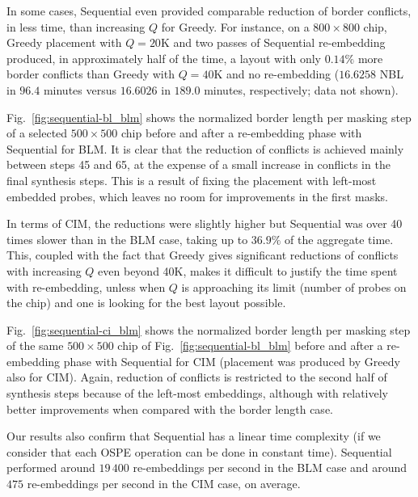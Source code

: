 In some cases, Sequential even provided comparable reduction of border
conflicts, in less time, than increasing $Q$ for Greedy. For instance, on a
$800\times 800$ chip, Greedy placement with $Q=20$K and two passes of Sequential
re-embedding produced, in approximately half of the time, a layout with only
$0.14\%$ more border conflicts than Greedy with $Q=40$K and no re-embedding
($16.6258$ NBL in $96.4$ minutes versus $16.6026$ in $189.0$ minutes,
respectively; data not shown).

Fig.~\ref{fig:sequential-bl_blm} shows the normalized border length per masking
step of a selected $500\times 500$ chip before and after a re-embedding phase
with Sequential for BLM. It is clear that the reduction of conflicts is achieved
mainly between steps 45 and 65, at the expense of a small increase in conflicts
in the final synthesis steps. This is a result of fixing the placement with
left-most embedded probes, which leaves no room for improvements in the first
masks.

In terms of CIM, the reductions were slightly higher but Sequential was over 40
times slower than in the BLM case, taking up to $36.9\%$ of the aggregate time.
This, coupled with the fact that Greedy gives significant reductions of
conflicts with increasing $Q$ even beyond 40K, makes it difficult to justify the
time spent with re-embedding, unless when $Q$ is approaching its limit (number
of probes on the chip) and one is looking for the best layout possible.

Fig.~\ref{fig:sequential-ci_blm} shows the normalized border length per masking
step of the same $500\times 500$ chip of Fig.~\ref{fig:sequential-bl_blm} before
and after a re-embedding phase with Sequential for CIM (placement was produced
by Greedy also for CIM). Again, reduction of conflicts is restricted to the
second half of synthesis steps because of the left-most embeddings, although
with relatively better improvements when compared with the border length case.

Our results also confirm that Sequential has a linear time complexity (if we
consider that each OSPE operation can be done in constant time). Sequential
performed around $19\,400$ re-embeddings per second in the BLM case and around
$475$ re-embeddings per second in the CIM case, on average.

